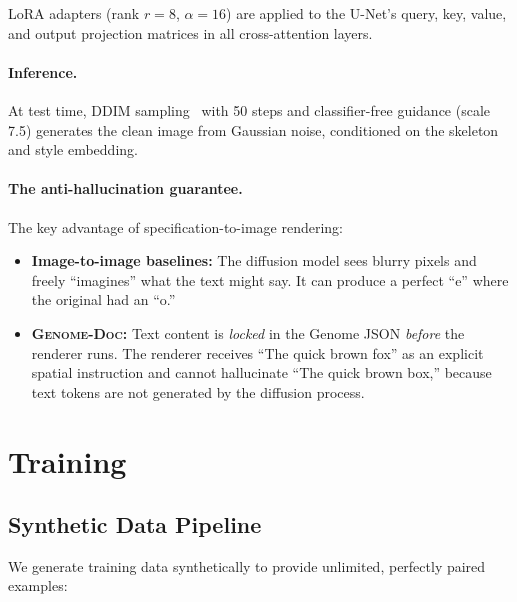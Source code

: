 \documentclass[conference]{IEEEtran}
\newcommand{\ours}{\textsc{Genome-Doc}}
\begin{document}
LoRA adapters (rank $r{=}8$, $\alpha{=}16$) are applied to the U-Net's
query, key, value, and output projection matrices in all cross-attention layers.

\paragraph{Inference.}
At test time, DDIM sampling~\cite{song2020ddim} with 50 steps and classifier-free
guidance (scale 7.5) generates the clean image from Gaussian noise, conditioned on
the skeleton and style embedding.

\paragraph{The anti-hallucination guarantee.}
The key advantage of specification-to-image rendering:
\begin{itemize}[leftmargin=*,nosep]
\item \textbf{Image-to-image baselines:}
  The diffusion model sees blurry pixels and freely ``imagines'' what the text might
  say.  It can produce a perfect ``e'' where the original had an ``o.''
\item \textbf{\ours:}
  Text content is \emph{locked} in the Genome JSON \emph{before} the renderer runs.
  The renderer receives ``The quick brown fox'' as an explicit spatial instruction and
  cannot hallucinate ``The quick brown box,'' because text tokens are not generated by
  the diffusion process.
\end{itemize}

\section{Training}
\label{sec:training}

\subsection{Synthetic Data Pipeline}
\label{sec:data}

We generate training data synthetically to provide unlimited, perfectly paired
examples:
\end{document}
